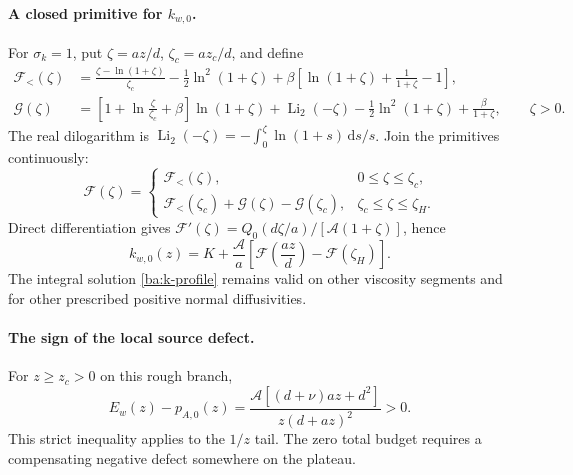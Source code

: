 \documentclass[11pt,a4paper]{article}
\numberwithin{equation}{section}
\begin{document}
\paragraph{A closed primitive for $k_{w,0}$.}
For $\sigma_k=1$, put $\zeta=az/d$, $\zeta_c=az_c/d$, and define
\begin{align}
 \mathcal F_< (\zeta)
 &=\frac{\zeta-\ln(1+\zeta)}{\zeta_c}
   -\frac12\ln^2(1+\zeta)
   +\beta\left[\ln(1+\zeta)+\frac1{1+\zeta}-1\right],
 \label{ba:primitive-lower}\\
 \mathcal G(\zeta)
 &=\left[1+\ln\frac{\zeta}{\zeta_c}+\beta\right]\ln(1+\zeta)
   +\operatorname{Li}_2(-\zeta)
   -\frac12\ln^2(1+\zeta)+\frac{\beta}{1+\zeta},\qquad\zeta>0.
 \label{ba:primitive-upper}
\end{align}
The real dilogarithm is
$\operatorname{Li}_2(-\zeta)=-\int_0^\zeta\ln(1+s)\,\mathrm ds/s$.
Join the primitives continuously:
\begin{equation}
 \mathcal F(\zeta)=
 \begin{cases}
 \mathcal F_< (\zeta),&0\leq\zeta\leq\zeta_c,\\
 \mathcal F_< (\zeta_c)+\mathcal G(\zeta)-\mathcal G(\zeta_c),
 &\zeta_c\leq\zeta\leq\zeta_H.
 \end{cases}
 \label{ba:primitive-joined}
\end{equation}
Direct differentiation gives
$\mathcal F'(\zeta)=Q_0(d\zeta/a)/[\mathcal A(1+\zeta)]$, hence
\begin{equation}
 \boxed{k_{w,0}(z)=K+\frac{\mathcal A}{a}
 \left[\mathcal F\!\left(\frac{az}{d}\right)
       -\mathcal F(\zeta_H)\right].}
 \label{ba:k-closed}
\end{equation}
The integral solution \eqref{ba:k-profile} remains valid on other
viscosity segments and for other prescribed positive normal diffusivities.

\paragraph{The sign of the local source defect.}
For $z\geq z_c>0$ on this rough branch,
\begin{equation}
 \boxed{E_w(z)-p_{A,0}(z)
 =\frac{\mathcal A[(d+\nu)az+d^2]}{z(d+az)^2}>0.}
 \label{ba:tail-defect}
\end{equation}
This strict inequality applies to the $1/z$ tail. The zero total budget
requires a compensating negative defect somewhere on the plateau.
\end{document}
